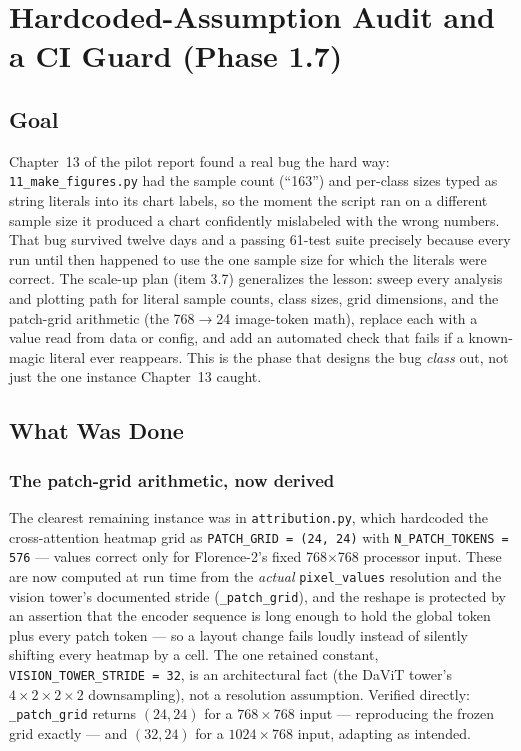 \chapter{Hardcoded-Assumption Audit and a CI Guard (Phase 1.7)}
\label{chap:p1-7}

\section{Goal}

Chapter~13 of the pilot report found a real bug the hard way: \texttt{11\_make\_figures.py} had the
sample count (``163'') and per-class sizes typed as string literals into its chart labels, so the
moment the script ran on a different sample size it produced a chart confidently mislabeled with the
wrong numbers. That bug survived twelve days and a passing 61-test suite precisely because every run
until then happened to use the one sample size for which the literals were correct. The scale-up plan
(item 3.7) generalizes the lesson: sweep every analysis and plotting path for literal sample counts,
class sizes, grid dimensions, and the patch-grid arithmetic (the 768$\rightarrow$24 image-token math),
replace each with a value read from data or config, and add an automated check that fails if a known-
magic literal ever reappears. This is the phase that designs the bug \emph{class} out, not just the one
instance Chapter~13 caught.

\section{What Was Done}

\subsection{The patch-grid arithmetic, now derived}

The clearest remaining instance was in \texttt{attribution.py}, which hardcoded the cross-attention
heatmap grid as \texttt{PATCH\_GRID = (24, 24)} with \texttt{N\_PATCH\_TOKENS = 576} --- values correct
only for Florence-2's fixed 768$\times$768 processor input. These are now computed at run time from the
\emph{actual} \texttt{pixel\_values} resolution and the vision tower's documented stride
(\texttt{\_patch\_grid}), and the reshape is protected by an assertion that the encoder sequence is long
enough to hold the global token plus every patch token --- so a layout change fails loudly instead of
silently shifting every heatmap by a cell. The one retained constant, \texttt{VISION\_TOWER\_STRIDE =
32}, is an architectural fact (the DaViT tower's $4\times2\times2\times2$ downsampling), not a
resolution assumption. Verified directly: \texttt{\_patch\_grid} returns $(24,24)$ for a $768\times768$
input --- reproducing the frozen grid exactly --- and $(32,24)$ for a $1024\times768$ input, adapting as
intended.

